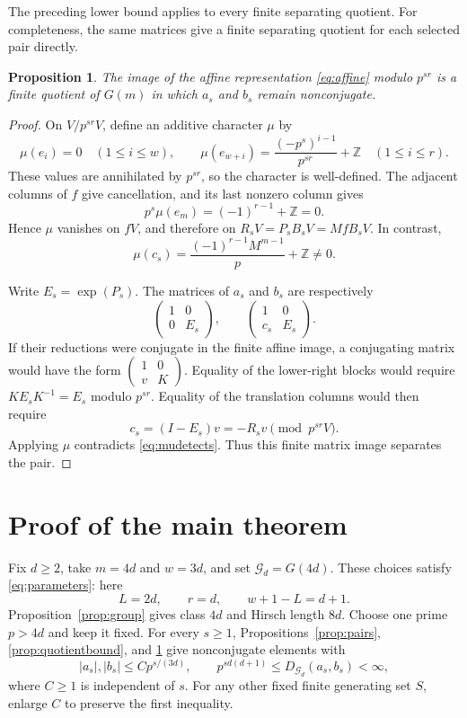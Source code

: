 \documentclass[11pt]{article}
\numberwithin{equation}{section}
\newtheorem{proposition}[theorem]{Proposition}
\theoremstyle{remark}
\newcommand{\Z}{\mathbb Z}
\newcommand{\Gp}{\mathcal G}
\begin{document}
The preceding lower bound applies to every finite separating quotient.
For completeness, the same matrices give a finite separating quotient
for each selected pair directly.

\begin{proposition}\label{prop:detector}
The image of the affine representation \eqref{eq:affine} modulo
$p^{sr}$ is a finite quotient of $G(m)$ in which $a_s$ and $b_s$
remain nonconjugate.
\end{proposition}

\begin{proof}
On $V/p^{sr}V$, define an additive character $\mu$ by
\[
 \mu(e_i)=0\quad(1\le i\le w),\qquad
 \mu(e_{w+i})=\frac{(-p^s)^{i-1}}{p^{sr}}+\Z
 \quad(1\le i\le r).
\]
These values are annihilated by $p^{sr}$, so the character is
well-defined. The adjacent columns of $f$ give cancellation, and its
last nonzero column gives
\[
 p^s\mu(e_m)=(-1)^{r-1}+\Z=0.
\]
Hence $\mu$ vanishes on $fV$, and therefore on
$R_sV=P_sB_sV=MfB_sV$. In contrast,
\begin{equation}\label{eq:mudetects}
 \mu(c_s)=\frac{(-1)^{r-1}M^{m-1}}p+\Z\ne0.
\end{equation}

Write $E_s=\exp(P_s)$. The matrices of $a_s$ and $b_s$ are
respectively
\[
 \begin{pmatrix}1&0\\0&E_s\end{pmatrix},\qquad
 \begin{pmatrix}1&0\\c_s&E_s\end{pmatrix}.
\]
If their reductions were conjugate in the finite affine image, a
conjugating matrix would have the form
$\left(\begin{smallmatrix}1&0\\v&K\end{smallmatrix}\right)$.
Equality of the lower-right blocks would require
$KE_sK^{-1}=E_s$ modulo $p^{sr}$. Equality of the translation
columns would then require
\[
 c_s=(I-E_s)v=-R_sv\pmod{p^{sr}V}.
\]
Applying $\mu$ contradicts \eqref{eq:mudetects}. Thus this finite
matrix image separates the pair.
\end{proof}

\section{Proof of the main theorem}\label{sec:finish}

Fix $d\ge2$, take $m=4d$ and $w=3d$, and set $\Gp_d=G(4d)$.
These choices satisfy \eqref{eq:parameters}: here
\[
 L=2d,\qquad r=d,\qquad w+1-L=d+1.
\]
Proposition~\ref{prop:group} gives class $4d$ and Hirsch length
$8d$. Choose one prime $p>4d$ and keep it fixed. For every $s\ge1$,
Propositions~\ref{prop:pairs}, \ref{prop:quotientbound}, and
\ref{prop:detector} give nonconjugate elements with
\begin{equation}\label{eq:finalpairs}
 |a_s|,|b_s|\le C p^{s/(3d)},\qquad
 p^{sd(d+1)}\le D_{\Gp_d}(a_s,b_s)<\infty,
\end{equation}
where $C\ge1$ is independent of $s$. For any other fixed finite
generating set $S$, enlarge $C$ to preserve the first inequality.
\end{document}
